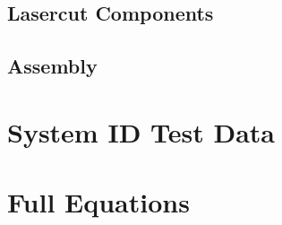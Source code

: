 \section{Lasercut Components}
\section{Assembly}
\chapter{System ID Test Data}
\label{app:systemdat}
\chapter{Full Equations}
\label{app:eq}
